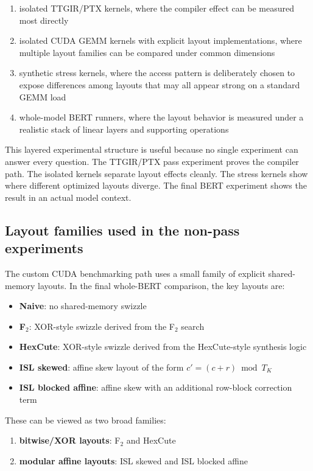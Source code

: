 \documentclass[11pt,a4paper]{article}
\begin{document}
\begin{enumerate}
\item isolated TTGIR/PTX kernels, where the compiler effect can be measured
      most directly
\item isolated CUDA GEMM kernels with explicit layout implementations, where
      multiple layout families can be compared under common dimensions
\item synthetic stress kernels, where the access pattern is deliberately chosen
      to expose differences among layouts that may all appear strong on a
      standard GEMM load
\item whole-model BERT runners, where the layout behavior is measured under a
      realistic stack of linear layers and supporting operations
\end{enumerate}

This layered experimental structure is useful because no single experiment can
answer every question.  The TTGIR/PTX pass experiment proves the compiler path.
The isolated kernels separate layout effects cleanly.  The stress kernels show
where different optimized layouts diverge.  The final BERT experiment shows the
result in an actual model context.

\subsection{Layout families used in the non-pass experiments}

The custom CUDA benchmarking path uses a small family of explicit shared-memory
layouts.  In the final whole-BERT comparison, the key layouts are:

\begin{itemize}
\item \textbf{Naive}: no shared-memory swizzle
\item \textbf{F$_2$}: XOR-style swizzle derived from the F$_2$ search
\item \textbf{HexCute}: XOR-style swizzle derived from the HexCute-style
      synthesis logic
\item \textbf{ISL skewed}: affine skew layout of the form
      \(c' = (c + r) \bmod T_K\)
\item \textbf{ISL blocked affine}: affine skew with an additional row-block
      correction term
\end{itemize}

These can be viewed as two broad families:

\begin{enumerate}
\item \textbf{bitwise/XOR layouts}: F$_2$ and HexCute
\item \textbf{modular affine layouts}: ISL skewed and ISL blocked affine
\end{enumerate}
\end{document}
